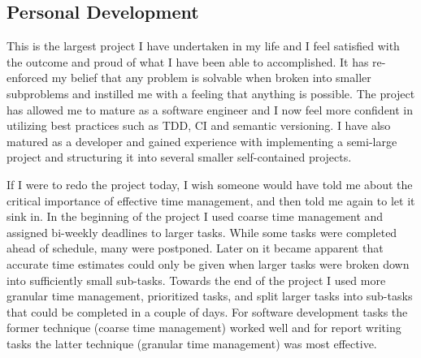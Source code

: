 
\subsection{Personal Development}

This is the largest project I have undertaken in my life and I feel satisfied with the outcome and proud of what I have been able to accomplished. It has re-enforced my belief that any problem is solvable when broken into smaller subproblems and instilled me with a feeling that anything is possible. The project has allowed me to mature as a software engineer and I now feel more confident in utilizing best practices such as TDD, CI and semantic versioning. I have also matured as a developer and gained experience with implementing a semi-large project and structuring it into several smaller self-contained projects.

If I were to redo the project today, I wish someone would have told me about the critical importance of effective time management, and then told me again to let it sink in. In the beginning of the project I used coarse time management and assigned bi-weekly deadlines to larger tasks. While some tasks were completed ahead of schedule, many were postponed. Later on it became apparent that accurate time estimates could only be given when larger tasks were broken down into sufficiently small sub-tasks. Towards the end of the project I used more granular time management, prioritized tasks, and split larger tasks into sub-tasks that could be completed in a couple of days. For software development tasks the former technique (coarse time management) worked well and for report writing tasks the latter technique (granular time management) was most effective.

